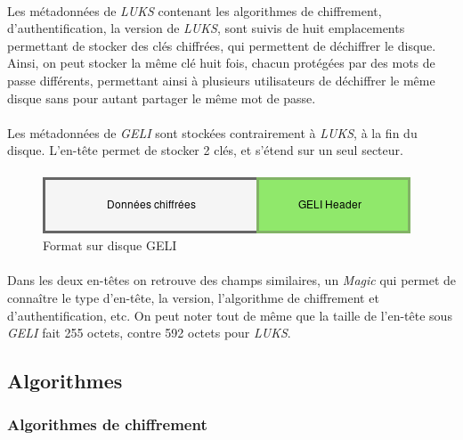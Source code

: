 \paragraph{}
Les métadonnées de {\em LUKS} contenant les algorithmes de chiffrement, 
d'authentification, la version de {\em LUKS}, sont suivis de huit emplacements 
permettant de stocker des clés chiffrées, qui permettent de déchiffrer le 
disque. Ainsi, on peut stocker la même clé huit fois, chacun protégées par des mots de 
passe différents, permettant ainsi à plusieurs utilisateurs de déchiffrer le 
même disque sans pour autant partager le même mot de passe.

\paragraph{}
Les métadonnées de {\em GELI} sont stockées contrairement à {\em LUKS}, 
à la fin du disque.
L'en-tête permet de stocker 2 clés, et s'étend sur un seul secteur.


\paragraph{}
\begin{figure}[h]
\centering
\includegraphics[width=.5\linewidth]{etat_art/format_disque_geli.png}
\caption{\label{fig:GELIFormat}Format sur disque GELI}
\end{figure}

\paragraph{}
Dans les deux en-têtes on retrouve des champs similaires, un {\em Magic} qui 
permet de connaître le type d'en-tête, la version, l'algorithme de chiffrement 
et d'authentification, etc. On peut noter tout de même que la taille de 
l'en-tête sous {\em GELI} fait 255 octets, contre 592 octets pour {\em LUKS}.



\subsection{Algorithmes}
\subsubsection{Algorithmes de chiffrement}
